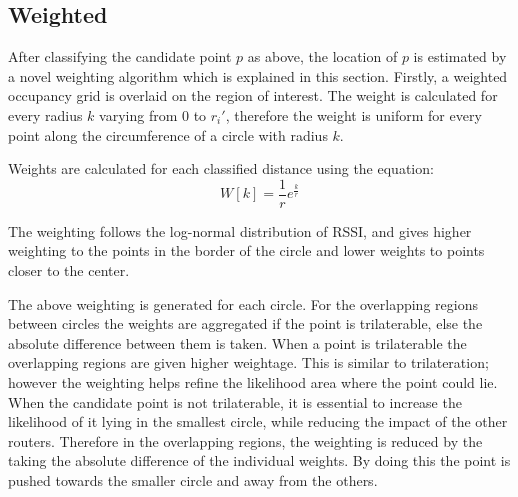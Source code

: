 \documentclass[twocolumn, 11pt]{IEEEtran}
\begin{document}



\subsection{Weighted}

After classifying the candidate point $p$ as above, the location of $p$ is estimated by a novel weighting algorithm which is explained in this section. Firstly, a weighted occupancy grid is overlaid on the region of interest. The weight is calculated for every radius $k$ varying from $0$ to $r_i'$, therefore the weight is uniform for every point along the circumference of a circle with radius $k$.

Weights are calculated for each classified distance using the equation:
\begin{equation}
W[k] = \frac{1}{r}  e^{\frac{k}{r}}    
\end{equation}

The weighting follows the log-normal distribution of RSSI, and gives higher weighting to the points in the border of the circle and lower weights to points closer to the center. 


\begin{algorithm}
\SetAlgoLined
{}
{
}
\label{Algorithm for calculating Weights}
\end{algorithm}

The above weighting is generated for each circle. For the overlapping regions between circles the weights are aggregated if the point is trilaterable, else the absolute difference between them is taken. When a point is trilaterable the overlapping regions are given higher weightage. This is similar to trilateration;  however the weighting helps refine the likelihood area where the point could lie. 
When the candidate point is not trilaterable, it is essential to increase the likelihood of it lying in the smallest circle, while reducing the impact of the other routers. Therefore in the overlapping regions, the weighting is reduced by the taking the absolute difference of the individual weights. By doing this the point is pushed towards the smaller circle and away from the others. 
\end{document}
